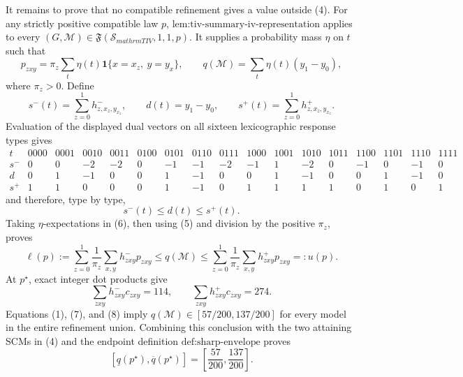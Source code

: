 It remains to prove that no compatible refinement gives a value outside (4).  For any strictly positive compatible law \(p\), \(\text{lem:tiv-summary-iv-representation}\) applies to every \((G,\mathcal M)\in\mathfrak F(\mathcal S_{mathrm{TIV}},1,1,p)\).  It supplies a probability mass \(\eta\) on \(t\) such that
\[
p_{zxy}=\pi_z\sum_t\eta(t)\mathbf 1\{x=x_z,\ y=y_x\},
\qquad
q(\mathcal M)=\sum_t\eta(t)(y_1-y_0),
\tag{5}
\]
where \(\pi_z>0\).  Define
\[
s^-(t)=\sum_{z=0}^1h^-_{z,x_z,y_{x_z}},
\qquad d(t)=y_1-y_0,
\qquad s^+(t)=\sum_{z=0}^1h^+_{z,x_z,y_{x_z}}.
\]
Evaluation of the displayed dual vectors on all sixteen lexicographic response types gives
\[
\begin{array}{c|rrrrrrrrrrrrrrrr}
t&0000&0001&0010&0011&0100&0101&0110&0111&1000&1001&1010&1011&1100&1101&1110&1111\\ \hline
s^-&0&0&-2&-2&0&-1&-1&-2&-1&1&-2&0&-1&0&-1&0\\
d&0&1&-1&0&0&1&-1&0&0&1&-1&0&0&1&-1&0\\
s^+&1&1&0&0&0&1&-1&0&1&1&1&1&0&1&0&1
\end{array}
\]
and therefore, type by type,
\[
s^-(t)\le d(t)\le s^+(t).
\tag{6}
\]
Taking \(\eta\)-expectations in (6), then using (5) and division by the positive \(\pi_z\), proves
\[
\ell(p):=\sum_{z=0}^1\frac{1}{\pi_z}\sum_{x,y}h^-_{zxy}p_{zxy}
\le q(\mathcal M)\le
\sum_{z=0}^1\frac{1}{\pi_z}\sum_{x,y}h^+_{zxy}p_{zxy}=:u(p).
\tag{7}
\]
At \(p^{\star}\), exact integer dot products give
\[
\sum_{zxy}h^-_{zxy}c_{zxy}=114,
\qquad
\sum_{zxy}h^+_{zxy}c_{zxy}=274.
\tag{8}
\]
Equations (1), (7), and (8) imply \(q(\mathcal M)\in[57/200,137/200]\) for every model in the entire refinement union.  Combining this conclusion with the two attaining SCMs in (4) and the endpoint definition \(\text{def:sharp-envelope}\) proves
\[
[\underline q(p^{\star}),\overline q(p^{\star})]
=\left[\frac{57}{200},\frac{137}{200}\right].
\tag{9}
\]


